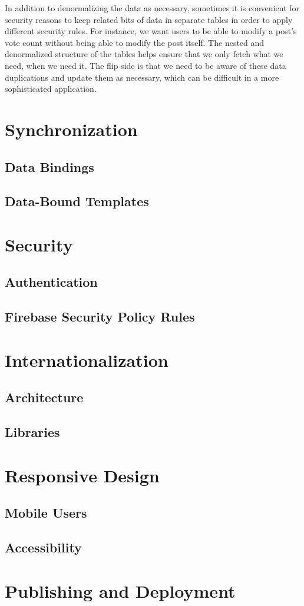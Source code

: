 In addition to denormalizing the data as necessary, sometimes it is convenient for security reasons to 
keep related bits of data in separate tables in order to apply different security rules.
For instance, we want users to be able to modify a post's vote count without being able to modify the post itself.
The nested and denormalized structure of the tables helps ensure that we only fetch what we need, when we need it.
The flip side is that we need to be aware of these data duplications and update them as necessary, 
which can be difficult in a more sophisticated application.

\section{Synchronization}
\label{sec:sync}

\subsection{Data Bindings}
\label{sec:databindings}

\subsection{Data-Bound Templates}

\section{Security}
\label{sec:security}

\subsection{Authentication}

\subsection{Firebase Security Policy Rules}
\label{sec:fbsecurity}

\section{Internationalization}
\label{sec:i18n}

\subsection{Architecture}
\subsection{Libraries}

\section{Responsive Design}
\label{sec:responsive}

\subsection{Mobile Users}

\subsection{Accessibility}

\section{Publishing and Deployment}
\label{publishing}
